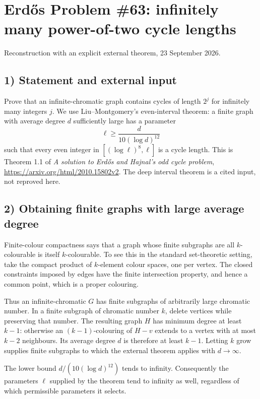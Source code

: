 \section{Erd\H{o}s Problem \#63: infinitely many power-of-two cycle lengths}
\noindent Reconstruction with an explicit external theorem, 23 September 2026.

\subsection*{1) Statement and external input}
Prove that an infinite-chromatic graph contains cycles of length $2^j$ for infinitely many integers $j$. We use Liu--Montgomery's even-interval theorem: a finite graph with average degree $d$ sufficiently large has a parameter
\[
 \ell\ge\frac{d}{10(\log d)^{12}}
\]
such that every even integer in $[(\log\ell)^8,\ell]$ is a cycle length. This is Theorem 1.1 of \emph{A solution to Erd\H{o}s and Hajnal's odd cycle problem}, \url{https://arxiv.org/html/2010.15802v2}. The deep interval theorem is a cited input, not reproved here.

\subsection*{2) Obtaining finite graphs with large average degree}
Finite-colour compactness says that a graph whose finite subgraphs are all $k$-colourable is itself $k$-colourable. To see this in the standard set-theoretic setting, take the compact product of $k$-element colour spaces, one per vertex. The closed constraints imposed by edges have the finite intersection property, and hence a common point, which is a proper colouring.

Thus an infinite-chromatic $G$ has finite subgraphs of arbitrarily large chromatic number. In a finite subgraph of chromatic number $k$, delete vertices while preserving that number. The resulting graph $H$ has minimum degree at least $k-1$: otherwise an $(k-1)$-colouring of $H-v$ extends to a vertex with at most $k-2$ neighbours. Its average degree $d$ is therefore at least $k-1$. Letting $k$ grow supplies finite subgraphs to which the external theorem applies with $d\to\infty$.

The lower bound $d/(10(\log d)^{12})$ tends to infinity. Consequently the parameters $\ell$ supplied by the theorem tend to infinity as well, regardless of which permissible parameters it selects.

